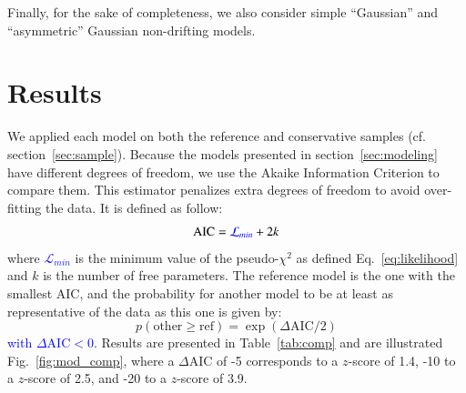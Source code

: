 \documentclass[]{aa} %
\newcommand{\nn}[1]{{\textcolor[rgb]{1, 0.27, 0}{#1}}}
\newcommand{\yc}[1]{{\textcolor{blue}{#1}}}
\begin{document}
Finally, for the sake of completeness, we also
consider simple ``Gaussian'' %
and ``asymmetric'' Gaussian %
non-drifting models. 


\section{Results}
\label{sec:results}

We applied each model on both the reference and conservative samples (cf.
section~\ref{sec:sample}). Because the models presented
in section~\ref{sec:modeling} have different degrees of freedom, we use the Akaike
Information Criterion \citep[AIC, e.g.][]{burnham2004} to compare them. This estimator
penalizes extra degrees of freedom to avoid over-fitting the data. It is defined
as follow:
\begin{equation}
    \mathrm{AIC} = \yc{\mathcal{L}_{min}} + 2k
\end{equation}
where \yc{$\mathcal{L}_{min}$} is
the minimum value of the pseudo-$\chi^2$ as defined Eq.~\eqref{eq:likelihood} and $k$ is the number of free parameters. The \nn{reference} model
is the one with the smallest AIC, and the probability for another model to be at
least as representative of the data as this one is given by:
\begin{equation}
    p(\mathrm{other} \geq \mathrm{ref}) =
    \exp\left(\Delta\mathrm{AIC}/2\right)
\end{equation}
\yc{with $\Delta\mathrm{AIC} < 0$}. Results are presented in Table~\ref{tab:comp} and are illustrated Fig.~\ref{fig:mod_comp}\nn{, where a $\Delta$AIC of -5 corresponds to a $z$-score of 1.4, -10 to a $z$-score of 2.5, and -20 to a $z$-score of 3.9}.
\end{document}
